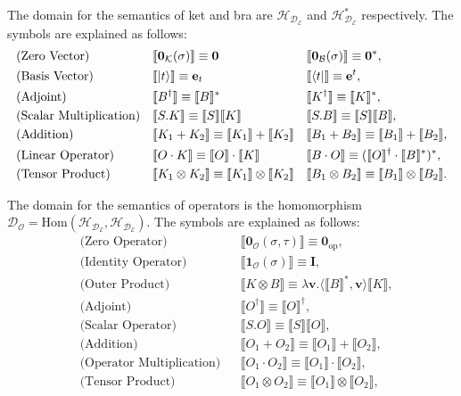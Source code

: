 \documentclass[manuscript, review, timestamp]{acmart}
\newcommand*{\sem}[1]{\llbracket #1 \rrbracket}
\begin{document}
\begin{definition}
  The domain for the semantics of ket and bra are $\mathcal{H}_{\mathcal{D}_\mathcal{E}}$ and $\mathcal{H}_{\mathcal{D}_\mathcal{E}}^*$ respectively.
  The symbols are explained as follows:
  \begin{align*}
    & \text{(Zero Vector)} &&
    \sem{\mathbf{0}_\mathcal{K}(\sigma)} \equiv \mathbf{0} && \sem{\mathbf{0}_\mathcal{B}(\sigma)} \equiv \mathbf{0}^*, \\
    & \text{(Basis Vector)} &&
    \sem{\ket{t}} \equiv \mathbf{e}_t && \sem{\bra{t}} \equiv \mathbf{e}^t, \\
    & \text{(Adjoint)} &&
    \sem{B^\dagger} \equiv \sem{B}^* && \sem{K^\dagger} \equiv \sem{K}^*, \\
    & \text{(Scalar Multiplication)} &&
    \sem{S.K} \equiv \sem{S} \sem{K} && \sem{S.B} \equiv \sem{S} \sem{B}, \\
    & \text{(Addition)} &&
    \sem{K_1 + K_2} \equiv \sem{K_1} + \sem{K_2} && \sem{B_1 + B_2} \equiv \sem{B_1} + \sem{B_2}, \\
    & \text{(Linear Operator)} &&
    \sem{O \cdot K} \equiv \sem{O} \cdot \sem{K} && \sem{B \cdot O} \equiv (\sem{O}^\dagger \cdot \sem{B}^*)^*, \\
    & \text{(Tensor Product)} &&
    \sem{K_1 \otimes K_2} \equiv \sem{K_1} \otimes \sem{K_2} && \sem{B_1 \otimes B_2} \equiv \sem{B_1} \otimes \sem{B_2}.
  \end{align*}
\end{definition}



\begin{definition}
  The domain for the semantics of operators is the homomorphism $\mathcal{D}_\mathcal{O} = \textrm{Hom}(\mathcal{H}_{\mathcal{D}_\mathcal{E}}, \mathcal{H}_{\mathcal{D}_\mathcal{E}})$.
  The symbols are explained as follows:
  \begin{align*}
    & \text{(Zero Operator)} &&
    \sem{\mathbf{0}_\mathcal{O}(\sigma, \tau)} \equiv \mathbf{0}_{\textrm{op}}, \\
    & \text{(Identity Operator)} &&
    \sem{\mathbf{1}_\mathcal{O}(\sigma)} \equiv \mathbf{I}, \\
    & \text{(Outer Product)} &&
    \sem{K \otimes B} \equiv \lambda \mathbf{v}. \langle \sem{B}^*, \mathbf{v}\rangle \sem{K}, \\
    & \text{(Adjoint)} &&
    \sem{O^\dagger} \equiv \sem{O}^\dagger, \\
    & \text{(Scalar Operator)} &&
    \sem{S.O} \equiv \sem{S} \sem{O}, \\
    & \text{(Addition)} &&
    \sem{O_1 + O_2} \equiv \sem{O_1}+\sem{O_2}, \\
    & \text{(Operator Multiplication)} &&
    \sem{O_1 \cdot O_2} \equiv \sem{O_1} \cdot \sem{O_2}, \\
    & \text{(Tensor Product)} &&
    \sem{O_1 \otimes O_2} \equiv \sem{O_1} \otimes \sem{O_2},
  \end{align*}
\end{definition}
\end{document}
